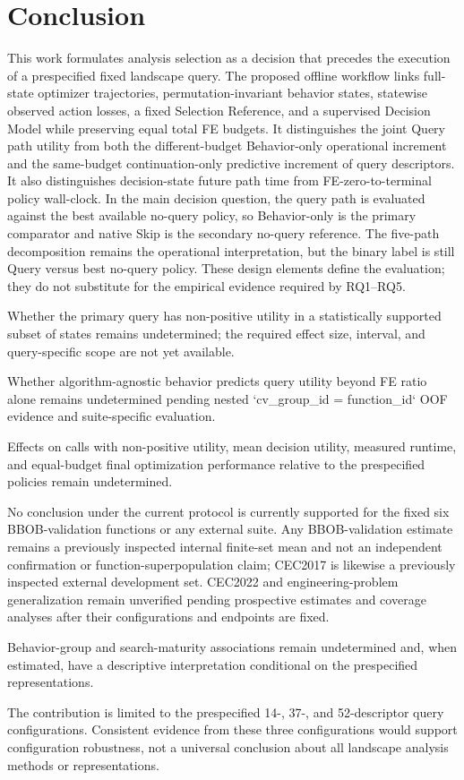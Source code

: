 \section{Conclusion}
\label{sec:conclusion}

This work formulates analysis selection as a decision that precedes the execution of a prespecified fixed landscape query. The proposed offline workflow links full-state optimizer trajectories, permutation-invariant behavior states, statewise observed action losses, a fixed Selection Reference, and a supervised Decision Model while preserving equal total FE budgets.  It distinguishes the joint Query path utility from both the different-budget Behavior-only operational increment and the same-budget continuation-only predictive increment of query descriptors.  It also distinguishes decision-state future path time from FE-zero-to-terminal policy wall-clock.  In the main decision question, the query path is evaluated against the best available no-query policy, so Behavior-only is the primary comparator and native Skip is the secondary no-query reference.  The five-path decomposition remains the operational interpretation, but the binary label is still Query versus best no-query policy.  These design elements define the evaluation; they do not substitute for the empirical evidence required by RQ1--RQ5.

 Whether the primary query has non-positive utility in a
statistically supported subset of states remains undetermined; the required
effect size, interval, and query-specific scope are not yet available.

 Whether algorithm-agnostic behavior predicts query utility
beyond FE ratio alone remains undetermined pending nested `cv_group_id = function_id`
OOF evidence and suite-specific evaluation.

 Effects on calls with non-positive utility, mean decision
utility, measured runtime, and equal-budget final optimization performance
relative to the prespecified policies remain undetermined.

 No conclusion under the current protocol is currently
supported for the fixed six BBOB-validation functions or any external suite.
Any BBOB-validation estimate remains a previously inspected internal finite-set
mean and not an independent confirmation or function-superpopulation claim;
CEC2017 is likewise a previously inspected external development set.  CEC2022
and engineering-problem generalization remain unverified pending prospective
estimates and coverage analyses after their configurations and endpoints are
fixed.

 Behavior-group and search-maturity associations remain
undetermined and, when estimated, have a descriptive interpretation conditional
on the prespecified representations.

The contribution is limited to the prespecified 14-, 37-, and 52-descriptor
query configurations. Consistent evidence from these three configurations
would support configuration robustness, not a universal conclusion about all
landscape analysis methods or representations.
